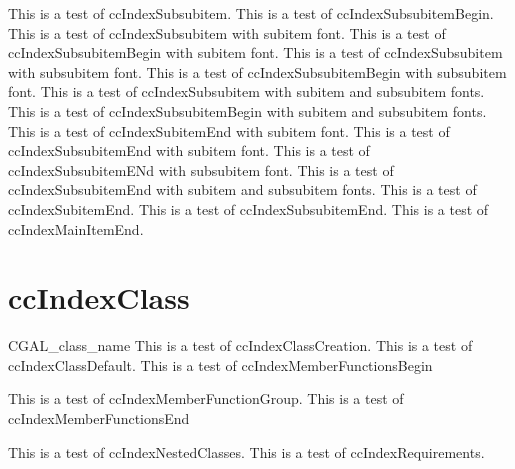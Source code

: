 \documentclass{article}
\begin{document}
{{{{This is a test of ccIndexSubsubitem.
This is a test of ccIndexSubsubitemBegin.
This is a test of ccIndexSubsubitem with subitem font.
This is a test of ccIndexSubsubitemBegin with subitem font.
This is a test of ccIndexSubsubitem with subsubitem font.
This is a test of ccIndexSubsubitemBegin with subsubitem font.
This is a test of ccIndexSubsubitem with subitem and subsubitem fonts.
This is a test of ccIndexSubsubitemBegin with subitem and subsubitem fonts.
\pagebreak
This is a test of ccIndexSubitemEnd with subitem font.
This is a test of ccIndexSubsubitemEnd with subitem font.
This is a test of ccIndexSubsubitemENd with subsubitem font.
This is a test of ccIndexSubsubitemEnd with subitem and subsubitem fonts.
This is a test of ccIndexSubitemEnd.
This is a test of ccIndexSubsubitemEnd.
This is a test of ccIndexMainItemEnd.

\section{ccIndexClass}

\begin{ccIndexClass}{CGAL_class_name}
This is a test of ccIndexClassCreation\ccIndexClassCreation.
This is a test of ccIndexClassDefault\ccIndexClassDefault.
This is a test of ccIndexMemberFunctionsBegin
\begin{ccIndexMemberFunctions}
This is a test of ccIndexMemberFunctionGroup.
This is a test of ccIndexMemberFunctionsEnd
\end{ccIndexMemberFunctions}
This is a test of ccIndexNestedClasses\ccIndexNestedClasses.
This is a test of ccIndexRequirements\ccIndexRequirements.


\end{ccIndexClass}}}}}
\end{document}
